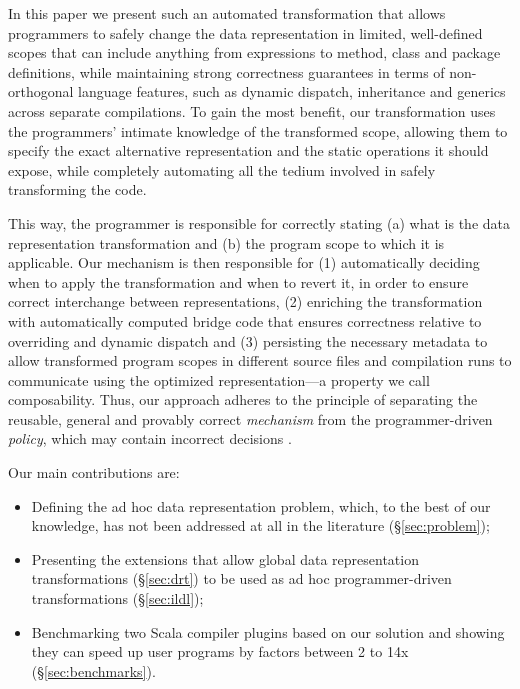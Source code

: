 In this paper we present such an automated transformation that allows
programmers to safely change the data representation in limited,
well-defined scopes that can include anything from expressions to
method, class and package definitions, while maintaining strong
correctness guarantees in terms of non-orthogonal language features,
such as dynamic dispatch, inheritance and generics across separate
compilations.
To gain the most benefit, our transformation uses the programmers'
intimate knowledge of the transformed scope, allowing them to specify
the exact alternative representation and the static operations it
should expose, while completely automating all the tedium involved in
safely transforming the code.

This way, the programmer is responsible for correctly stating (a)
what is the data representation transformation and (b) the program
scope to which it is applicable. Our mechanism is then
responsible for (1) automatically deciding when to apply the
transformation and when to revert it, in order to ensure correct
interchange between representations, (2) enriching the transformation
with automatically computed bridge code that ensures correctness
relative to overriding and dynamic dispatch and (3) persisting
the necessary metadata to allow transformed program scopes in
different source files and compilation runs to communicate using
the optimized representation---a property we call composability.
Thus, our approach adheres to the principle of separating the
reusable, general and provably correct \emph{mechanism} from the
programmer-driven \emph{policy}, which may contain incorrect
decisions \cite{lampson-mechanism-policy}.

Our main contributions are:
\begin{itemize}
  \item Defining the ad hoc data representation problem, which, to the
    best of our knowledge, has not been addressed at all in the
    literature (\S\ref{sec:problem});
  \item Presenting the extensions that allow global data
    representation transformations (\S\ref{sec:drt}) to be used as
    ad hoc programmer-driven transformations (\S\ref{sec:ildl});
  \item Benchmarking two Scala compiler plugins based on our solution
    and showing they can speed up user programs by factors between 2
    to 14x (\S\ref{sec:benchmarks}).
\end{itemize}

